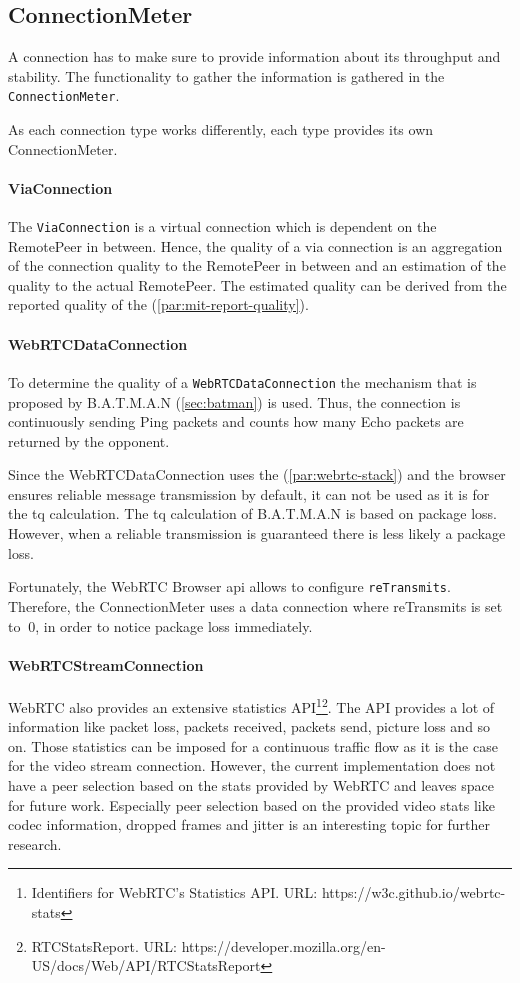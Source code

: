 \subsection{ConnectionMeter}\label{sec:mit-connectionMeter}
A connection has to make sure to provide information about its throughput and stability. The functionality to gather the information is gathered in the \lstinline|ConnectionMeter|.

As each connection type works differently, each type provides its own ConnectionMeter.

\paragraph{ViaConnection}
The \lstinline|ViaConnection| is a virtual connection which is dependent on the RemotePeer in between. Hence, the quality of a via connection is an aggregation of the connection quality to the RemotePeer in between and an estimation of the quality to the actual RemotePeer. The estimated quality can be derived from the reported quality of the \peerUpdate (\vref{par:mit-report-quality}).

\paragraph{WebRTCDataConnection} \label{par:webrtc-data-measure-quality}
To determine the quality of a \lstinline|WebRTCDataConnection| the  mechanism that is proposed by B.A.T.M.A.N (\vref{sec:batman}) is used. Thus, the connection is continuously sending Ping packets and counts how many Echo packets are returned by the opponent. 

Since the WebRTCDataConnection uses the  (\vref{par:webrtc-stack}) and the browser ensures reliable message transmission by default, it can not be used as it is for the \gls{tq} calculation. The \gls{tq} calculation of B.A.T.M.A.N is based on package loss. However, when a reliable transmission is guaranteed there is less likely a package loss.

Fortunately, the WebRTC Browser \gls{api} allows to configure \lstinline|reTransmits|. Therefore, the ConnectionMeter uses a data connection where reTransmits is set to $\ 0 $, in order to notice package loss immediately.

\paragraph{WebRTCStreamConnection}
WebRTC also provides an extensive statistics API\footnote{Identifiers for WebRTC's Statistics API. URL: {https://w3c.github.io/webrtc-stats}}\footnote{RTCStatsReport. URL: https://developer.mozilla.org/en-US/docs/Web/API/RTCStatsReport}. The API provides a lot of information like packet loss, packets received, packets send, picture loss and so on. Those statistics can be imposed for a continuous traffic flow as it is the case for the video stream connection. However, the current implementation does not have a peer selection based on the stats provided by WebRTC and leaves space for future work. Especially peer selection based on the provided video stats like codec information, dropped frames and jitter is an interesting topic for further research.

